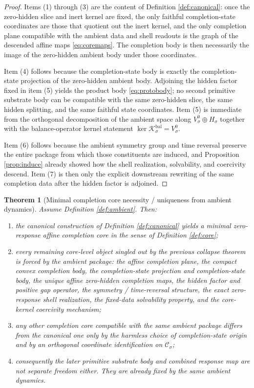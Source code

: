 \documentclass[11pt]{article}
\newcommand{\ZeroHiddenVec}[1]{V_{#1}^{0}}
\newcommand{\BalOp}[1]{\mathcal K_{#1}^{\mathrm{bal}}}
\newcommand{\GapSpace}[1]{H_{#1}}
\newcommand{\CoreState}[1]{\mathcal C_{#1}}
\newtheorem{theorem}{Theorem}
\begin{document}
\begin{proof}
Items (1) through (3) are the content of Definition \ref{def:canonical}: once the zero-hidden slice and inert kernel are fixed, the only faithful completion-state coordinates are those that quotient out the inert kernel, and the only completion plane compatible with the ambient data and shell readouts is the graph of the descended affine maps \eqref{eq:coremaps}. The completion body is then necessarily the image of the zero-hidden ambient body under those coordinates.

Item (4) follows because the completion-state body is exactly the completion-state projection of the zero-hidden ambient body. Adjoining the hidden factor fixed in item (5) yields the product body \eqref{eq:protobody}; no second primitive substrate body can be compatible with the same zero-hidden slice, the same hidden splitting, and the same faithful state coordinates. Item (5) is immediate from the orthogonal decomposition of the ambient space along \(\ZeroHiddenVec{\sigma}\oplus\GapSpace{\sigma}\) together with the balance-operator kernel statement \(\ker \BalOp{\sigma}=\ZeroHiddenVec{\sigma}\).

Item (6) follows because the ambient symmetry group and time reversal preserve the entire package from which those constituents are induced, and Proposition \ref{prop:induce} already showed how the shell realization, solvability, and coercivity descend. Item (7) is then only the explicit downstream rewriting of the same completion data after the hidden factor is adjoined.
\end{proof}

\begin{theorem}[Minimal completion core necessity / uniqueness from ambient dynamics]
\label{thm:necessity}
Assume Definition \ref{def:ambient}. Then:
\begin{enumerate}
    \item the canonical construction of Definition \ref{def:canonical} yields a minimal zero-response affine completion core in the sense of Definition \ref{def:core};
    \item every remaining core-level object singled out by the previous collapse theorem is forced by the ambient package: the affine completion plane, the compact convex completion body, the completion-state projection and completion-state body, the unique affine zero-hidden completion maps, the hidden factor and positive gap operator, the symmetry / time-reversal structure, the exact zero-response shell realization, the fixed-data solvability property, and the core-kernel coercivity mechanism;
    \item any other completion core compatible with the same ambient package differs from the canonical one only by the harmless choice of completion-state origin and by an orthogonal coordinate identification on \(\CoreState{\sigma}\);
    \item consequently the later primitive substrate body and combined response map are not separate freedom either. They are already fixed by the same ambient dynamics.
\end{enumerate}
\end{theorem}
\end{document}
